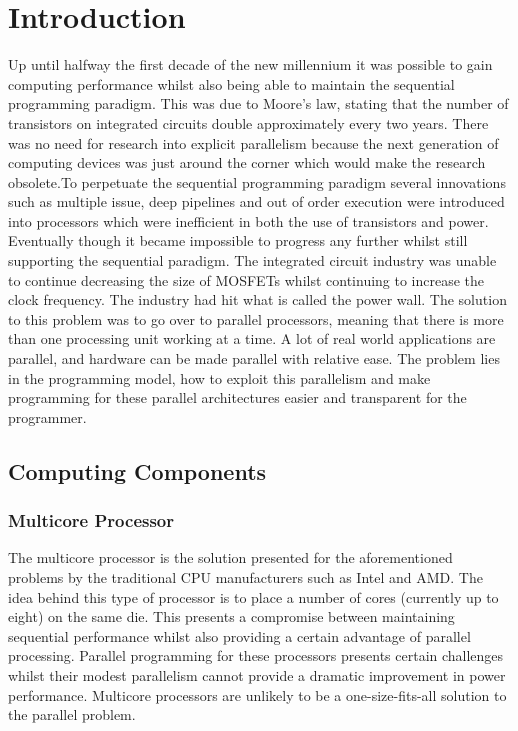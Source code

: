 



\chapter{Introduction} 
Up until halfway the first decade of the new millennium it was possible to gain computing performance whilst also being able to maintain the sequential programming paradigm. This was due to Moore's law, stating that the number of transistors on integrated circuits double approximately every two years. There was no need for research into explicit parallelism because the next generation of computing devices was just around the corner which would make the research obsolete.To perpetuate the sequential programming paradigm several innovations such as multiple issue, deep pipelines and out of order execution were introduced into processors which were inefficient in both the use of transistors and power.  Eventually though it became impossible to progress any further whilst still supporting the sequential paradigm. The integrated circuit industry was unable to continue decreasing the size of MOSFETs whilst continuing to increase the clock frequency. The industry had hit what is called the power wall.
The solution to this problem was to go over to parallel processors, meaning that there is more than one processing unit working at a time. A lot of real world applications are parallel, and hardware can be made parallel with relative ease. The problem lies in the programming model, how to exploit this parallelism and make programming for these parallel architectures easier and transparent for the programmer.

\section{Computing Components}

\subsection{Multicore Processor}
The multicore processor is the solution presented for the aforementioned problems by the traditional CPU manufacturers such as Intel and AMD. The idea behind this type of processor is to place a number of cores (currently up to eight) on the same die. This presents a compromise between maintaining sequential performance whilst also providing a certain advantage of parallel processing. Parallel programming for these processors presents certain challenges whilst their modest parallelism cannot provide a dramatic improvement in power performance. Multicore processors are unlikely to be a one-size-fits-all solution to the parallel problem.\cite{asanovic_landscape_????}

